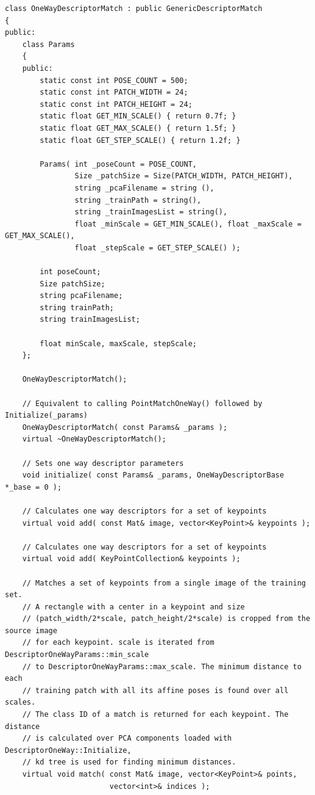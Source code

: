 \begin{lstlisting}
class OneWayDescriptorMatch : public GenericDescriptorMatch
{
public:
    class Params
    {
    public:
        static const int POSE_COUNT = 500;
        static const int PATCH_WIDTH = 24;
        static const int PATCH_HEIGHT = 24;
        static float GET_MIN_SCALE() { return 0.7f; }
        static float GET_MAX_SCALE() { return 1.5f; }
        static float GET_STEP_SCALE() { return 1.2f; }

        Params( int _poseCount = POSE_COUNT,
                Size _patchSize = Size(PATCH_WIDTH, PATCH_HEIGHT),
                string _pcaFilename = string (),
                string _trainPath = string(),
                string _trainImagesList = string(),
                float _minScale = GET_MIN_SCALE(), float _maxScale = GET_MAX_SCALE(),
                float _stepScale = GET_STEP_SCALE() );

        int poseCount;
        Size patchSize;
        string pcaFilename;
        string trainPath;
        string trainImagesList;

        float minScale, maxScale, stepScale;
    };

    OneWayDescriptorMatch();

    // Equivalent to calling PointMatchOneWay() followed by Initialize(_params)
    OneWayDescriptorMatch( const Params& _params );
    virtual ~OneWayDescriptorMatch();

    // Sets one way descriptor parameters
    void initialize( const Params& _params, OneWayDescriptorBase *_base = 0 );

    // Calculates one way descriptors for a set of keypoints
    virtual void add( const Mat& image, vector<KeyPoint>& keypoints );

    // Calculates one way descriptors for a set of keypoints
    virtual void add( KeyPointCollection& keypoints );

    // Matches a set of keypoints from a single image of the training set.
    // A rectangle with a center in a keypoint and size 
    // (patch_width/2*scale, patch_height/2*scale) is cropped from the source image
    // for each keypoint. scale is iterated from DescriptorOneWayParams::min_scale
    // to DescriptorOneWayParams::max_scale. The minimum distance to each 
    // training patch with all its affine poses is found over all scales.
    // The class ID of a match is returned for each keypoint. The distance 
    // is calculated over PCA components loaded with DescriptorOneWay::Initialize,
    // kd tree is used for finding minimum distances.
    virtual void match( const Mat& image, vector<KeyPoint>& points, 
	                    vector<int>& indices );


\end{lstlisting}
